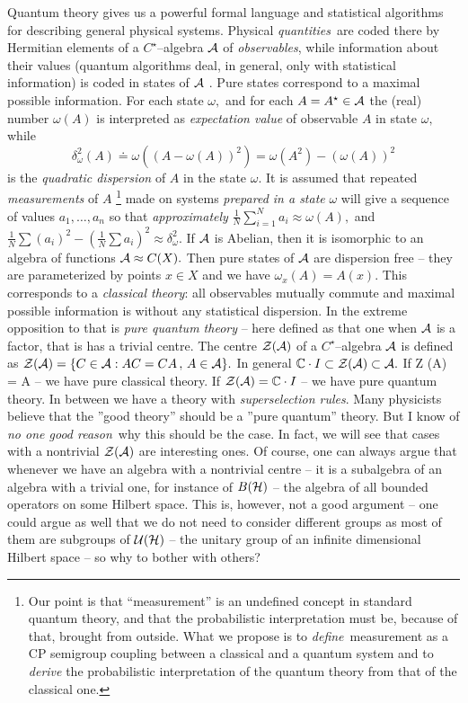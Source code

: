 \documentclass[12pt]{article}
\def\complex{{\mathbb C}}
\begin{document}
Quantum theory gives us a powerful formal language and
statistical algorithms for
describing general physical systems.
Physical {\em quantities}\ are coded there by
Hermitian elements of a $C^{\star }$--algebra ${\cal A}$ of {\em observables}, 
while information about their values  (quantum algorithms deal,  in general, 
only with statistical information)  is coded in states of 
${\cal A}$ .  Pure states correspond to a maximal possible information.  For
each state $\omega , $ and for each $A=A^{\star }\in {\cal A}$ the  (real)
number
$\omega
 (A)$ is interpreted as {\em expectation value} of observable $A$ in state $
\omega , $ while 
$$
\delta _\omega ^2 (A)\doteq \omega  ( (A-\omega  (A))^2)=\omega 
 (A^2)- (\omega  (A))^2 
$$
is the {\em quadratic dispersion} of $A$ in the state $\omega . $ It is assumed
that repeated {\em measurements} of $A$
\footnote{Our point is that ``measurement'' is an undefined concept in
standard quantum theory, and that the probabilistic interpretation
must be, because of that, brought from outside. What we propose
is to {\em define}\, measurement as a CP semigroup coupling between a
classical and a quantum system and to {\em derive} the probabilistic
interpretation of the quantum theory from that of the classical one.}
made on systems 
{\em prepared in a state} $
\omega $ will give a sequence of values $a_1, \ldots , a_n$ so that 
{\em approximately} ${\frac
1N}\sum_{i=1}^Na_i\approx \omega  (A), $ and ${\frac 1N}\sum  (a_i)^2- ({\frac 1N
}\sum a_i)^2\approx \delta _\omega ^2. $ If ${\cal A}$ is Abelian,  then it is
isomorphic to an algebra of functions ${\cal A}\approx C (X). $ Then pure
states of ${\cal A}$ are dispersion free -- they are parameterized by points $
x\in X$ and we have $\omega _x (A)=A (x). $ This corresponds to a {\em classical
theory}:  all observables mutually commute and maximal possible information
is without any statistical dispersion.  In the extreme opposition to that is
{\em pure quantum theory} -- here defined as that one 
when ${\cal A}$ is a factor, that is has a trivial centre.  The centre
${\cal Z (A)}$ of a $C^\star$--algebra ${\cal A}$ is defined as
${\cal Z (A)}=\{C\in {\cal A}
: AC=CA\, , \, A\in {\cal A}\}. $ In general $\complex \cdot I\subset {\cal Z (A)}
\subset 
{\cal A}. $ If {\cal Z (A) = A} -- we have pure classical theory.  If ${\cal 
Z (A)}=\complex \cdot I$ -- we have pure quantum theory.  In between we have 
a theory
with {\em superselection rules}.  Many physicists believe that the ''good
theory'' should be a ''pure quantum'' theory.  But I know of {\em no one good
 reason}\
why this should be the case.  In fact,  we will see that cases with a
nontrivial ${\cal Z (A)}$ are interesting ones.  Of course,  one can always
argue that whenever we have an algebra with a nontrivial centre -- it is a
subalgebra of an algebra with a trivial one,  for instance of $B ({\cal H})$
-- the algebra of all bounded operators on some Hilbert space.  This is,
however, not a good argument -- one could argue as well that we do not need
to consider different groups as most of them are subgroups of ${\cal U (H)}$
-- the unitary group of an infinite dimensional Hilbert space -- so why
to bother with others?
\end{document}
